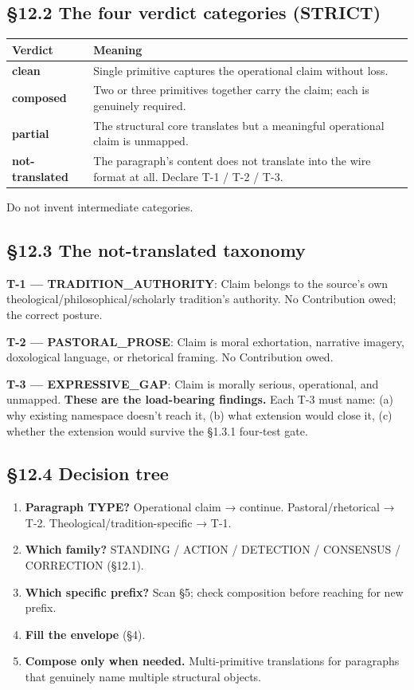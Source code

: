 \documentclass[10pt]{article}
\begin{document}
\subsection*{§12.2 The four verdict categories (STRICT)}


{\footnotesize
\begin{longtable}{|p{8.0cm}|p{8.0cm}|}\hline
\textbf{Verdict} & \textbf{Meaning} \\ \hline\endhead
\textbf{clean} & Single primitive captures the operational claim without loss. \\ \hline
\textbf{composed} & Two or three primitives together carry the claim; each is genuinely required. \\ \hline
\textbf{partial} & The structural core translates but a meaningful operational claim is unmapped. \\ \hline
\textbf{not-translated} & The paragraph's content does not translate into the wire format at all. Declare T-1 / T-2 / T-3. \\ \hline
\end{longtable}}


Do not invent intermediate categories.


\subsection*{§12.3 The not-translated taxonomy}


\textbf{T-1 — TRADITION\_AUTHORITY}: Claim belongs to the source's own theological/philosophical/scholarly tradition's authority. No Contribution owed; the correct posture.


\textbf{T-2 — PASTORAL\_PROSE}: Claim is moral exhortation, narrative imagery, doxological language, or rhetorical framing. No Contribution owed.


\textbf{T-3 — EXPRESSIVE\_GAP}: Claim is morally serious, operational, and unmapped. \textbf{These are the load-bearing findings.} Each T-3 must name: (a) why existing namespace doesn't reach it, (b) what extension would close it, (c) whether the extension would survive the §1.3.1 four-test gate.


\subsection*{§12.4 Decision tree}


\begin{enumerate}\setlength\itemsep{0pt}
\item \textbf{Paragraph TYPE?} Operational claim → continue. Pastoral/rhetorical → T-2. Theological/tradition-specific → T-1.
\item \textbf{Which family?} STANDING / ACTION / DETECTION / CONSENSUS / CORRECTION (§12.1).
\item \textbf{Which specific prefix?} Scan §5; check composition before reaching for new prefix.
\item \textbf{Fill the envelope} (§4).
\item \textbf{Compose only when needed.} Multi-primitive translations for paragraphs that genuinely name multiple structural objects.
\end{enumerate}
\end{document}
